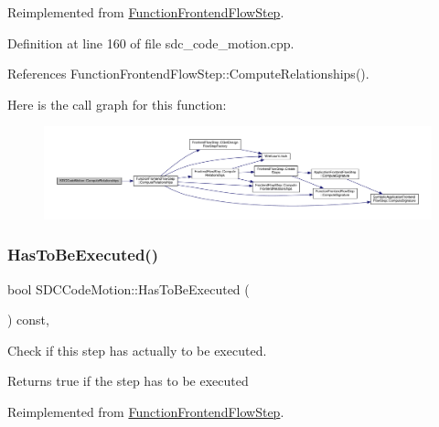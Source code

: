 Reimplemented from \hyperlink{classFunctionFrontendFlowStep_a1a815ea7885f3e92e414dadd40c43cba}{Function\+Frontend\+Flow\+Step}.



Definition at line 160 of file sdc\+\_\+code\+\_\+motion.\+cpp.



References Function\+Frontend\+Flow\+Step\+::\+Compute\+Relationships().

Here is the call graph for this function\+:
\nopagebreak
\begin{figure}[H]
\begin{center}
\leavevmode
\includegraphics[width=350pt]{d3/de8/classSDCCodeMotion_aba1edb7d7851104686225cf6aaa92c56_cgraph}
\end{center}
\end{figure}
\mbox{\label{classSDCCodeMotion_ae41623316514debbca9be2eed971fa09}} 
\subsubsection{\texorpdfstring{Has\+To\+Be\+Executed()}{HasToBeExecuted()}}
{\footnotesize\ttfamily bool S\+D\+C\+Code\+Motion\+::\+Has\+To\+Be\+Executed (\begin{DoxyParamCaption}{ }\end{DoxyParamCaption}) const\hspace{0.3cm}{\ttfamily [override]}, {\ttfamily [virtual]}}



Check if this step has actually to be executed. 

\begin{DoxyReturn}{Returns}
true if the step has to be executed 
\end{DoxyReturn}


Reimplemented from \hyperlink{classFunctionFrontendFlowStep_a12e786363530aa9533e4bd9380130d75}{Function\+Frontend\+Flow\+Step}.




